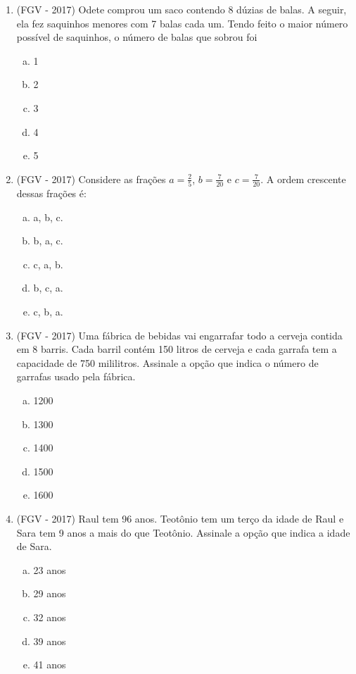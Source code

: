\begin{enumerate}
  \item (FGV - 2017) Odete comprou um saco contendo 8 dúzias de balas. A seguir, ela fez saquinhos menores com 7 balas cada um. Tendo feito o maior número possível de saquinhos, o número de balas que sobrou foi
  \begin{enumerate}[a)]
  \item 1
  \item 2
  \item 3
  \item 4
  \item 5
  \end{enumerate}

  \item (FGV - 2017) Considere as frações $a= \frac{2}{5}$, $b=\frac{7}{20}$ e $c=\frac{7}{20}$. A ordem crescente dessas frações é:
  \begin{enumerate}[a)]
  \item a, b, c.
  \item b, a, c.
  \item c, a, b.
  \item b, c, a.
  \item c, b, a.
  \end{enumerate}

  \item (FGV - 2017) Uma fábrica de bebidas vai engarrafar todo a cerveja contida em 8 barris. Cada barril contém 150 litros de cerveja e cada garrafa tem a capacidade de 750 mililitros. Assinale a opção que indica o número de garrafas usado pela fábrica.
  \begin{enumerate}[a)]
  \item 1200
  \item 1300
  \item 1400
  \item 1500
  \item 1600
  \end{enumerate}

  \item (FGV - 2017) Raul tem 96 anos. Teotônio tem um terço da idade de Raul e Sara tem 9 anos a mais do que Teotônio. Assinale a opção que indica a idade de Sara.
  \begin{enumerate}[a)]
  \item 23 anos
  \item 29 anos
  \item 32 anos
  \item 39 anos
  \item 41 anos
  \end{enumerate}


\end{enumerate}
